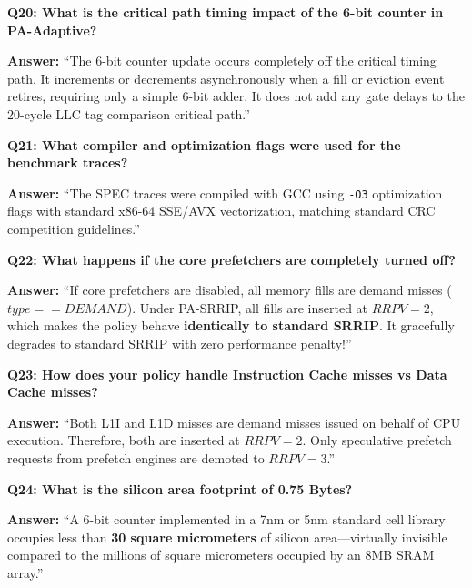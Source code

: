 \documentclass[11pt, a4paper]{article}
\begin{document}
\begin{trapbox}
\textbf{Q20: What is the critical path timing impact of the 6-bit counter in PA-Adaptive?}
\end{trapbox}
\begin{answerbox}
\textbf{Answer:} ``The 6-bit counter update occurs completely off the critical timing path. It increments or decrements asynchronously when a fill or eviction event retires, requiring only a simple 6-bit adder. It does not add any gate delays to the 20-cycle LLC tag comparison critical path.''
\end{answerbox}

\begin{trapbox}
\textbf{Q21: What compiler and optimization flags were used for the benchmark traces?}
\end{trapbox}
\begin{answerbox}
\textbf{Answer:} ``The SPEC traces were compiled with GCC using \texttt{-O3} optimization flags with standard x86-64 SSE/AVX vectorization, matching standard CRC competition guidelines.''
\end{answerbox}

\begin{trapbox}
\textbf{Q22: What happens if the core prefetchers are completely turned off?}
\end{trapbox}
\begin{answerbox}
\textbf{Answer:} ``If core prefetchers are disabled, all memory fills are demand misses ($type == DEMAND$). Under PA-SRRIP, all fills are inserted at $RRPV=2$, which makes the policy behave \textbf{identically to standard SRRIP}. It gracefully degrades to standard SRRIP with zero performance penalty!''
\end{answerbox}

\begin{trapbox}
\textbf{Q23: How does your policy handle Instruction Cache misses vs Data Cache misses?}
\end{trapbox}
\begin{answerbox}
\textbf{Answer:} ``Both L1I and L1D misses are demand misses issued on behalf of CPU execution. Therefore, both are inserted at $RRPV=2$. Only speculative prefetch requests from prefetch engines are demoted to $RRPV=3$.''
\end{answerbox}

\begin{trapbox}
\textbf{Q24: What is the silicon area footprint of 0.75 Bytes?}
\end{trapbox}
\begin{answerbox}
\textbf{Answer:} ``A 6-bit counter implemented in a 7nm or 5nm standard cell library occupies less than \textbf{30 square micrometers} of silicon area---virtually invisible compared to the millions of square micrometers occupied by an 8MB SRAM array.''
\end{answerbox}
\end{document}
